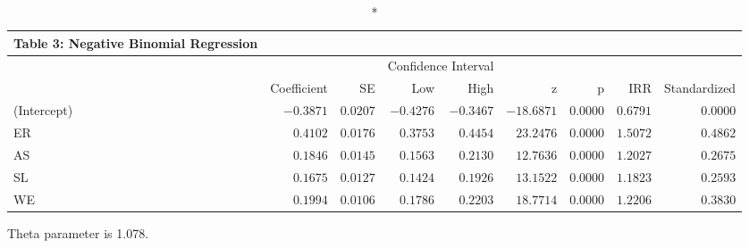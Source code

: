 \setlength{\LTpost}{0mm}
\begin{longtable}{l|rrrrrrrr}
\caption*{
{\large Table 3: Negative Binomial Regression}
} \\ 
\toprule
\multicolumn{1}{l}{} &  &  & \multicolumn{2}{c}{Confidence Interval} &  &  &  &  \\ 
\cmidrule(lr){4-5}
\multicolumn{1}{l}{} & Coefficient & SE & Low & High & z & p & IRR & Standardized \\ 
\midrule
(Intercept) & $-0.3871$ & $0.0207$ & $-0.4276$ & $-0.3467$ & $-18.6871$ & $0.0000$ & $0.6791$ & $0.0000$ \\ 
ER & $0.4102$ & $0.0176$ & $0.3753$ & $0.4454$ & $23.2476$ & $0.0000$ & $1.5072$ & $0.4862$ \\ 
AS & $0.1846$ & $0.0145$ & $0.1563$ & $0.2130$ & $12.7636$ & $0.0000$ & $1.2027$ & $0.2675$ \\ 
SL & $0.1675$ & $0.0127$ & $0.1424$ & $0.1926$ & $13.1522$ & $0.0000$ & $1.1823$ & $0.2593$ \\ 
WE & $0.1994$ & $0.0106$ & $0.1786$ & $0.2203$ & $18.7714$ & $0.0000$ & $1.2206$ & $0.3830$ \\ 
\bottomrule
\end{longtable}
\begin{minipage}{\linewidth}
Theta parameter is 1.078.\\
\end{minipage}

